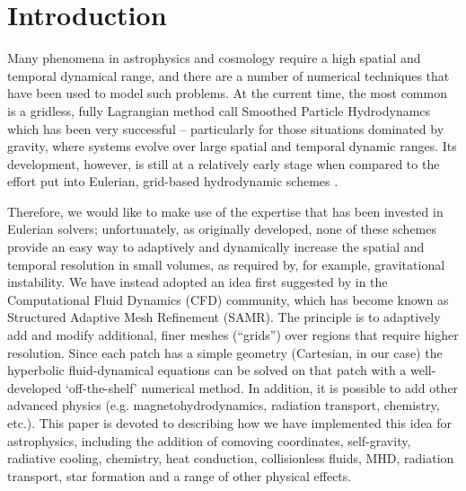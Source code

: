 
\section{Introduction}\label{sec.intro}


Many phenomena in astrophysics and cosmology require a high spatial and temporal dynamical range, and there are a number of numerical techniques that have been used to model such problems.  At the current time, the most common is a gridless, fully Lagrangian method call Smoothed Particle Hydrodynamcs \citep[SPH;][]{Lucy77, SPH} which has been very successful -- particularly for those situations dominated by gravity, where systems evolve over large spatial and temporal dynamic ranges.  Its development, however, is still at a relatively early stage when compared to the effort put into Eulerian, grid-based hydrodynamic schemes \citep[e.g.,][]{laney-1998, toro-1997, Woodward84}. 

Therefore, we would like to make use of the expertise that has been invested in Eulerian solvers; unfortunately, as originally developed, none of these schemes provide an easy way to adaptively and dynamically increase the spatial and temporal resolution in small volumes, as required by, for example, gravitational instability.  We have instead adopted an idea first suggested by \citet{Berger89} in the Computational Fluid Dynamics (CFD) community, which has become known as Structured Adaptive Mesh Refinement (SAMR).  The principle is to adaptively add and modify additional, finer meshes (``grids'') over regions that require higher resolution.  Since each patch has a simple geometry (Cartesian, in our case) the hyperbolic fluid-dynamical equations can be solved on that patch with a well-developed `off-the-shelf' numerical method.  In addition, it is possible to add other advanced physics (e.g. magnetohydrodynamics, radiation transport, chemistry, etc.). This paper is devoted to describing how we have implemented this idea for astrophysics, including the addition of comoving coordinates, self-gravity, radiative cooling, chemistry, heat conduction, collisionless fluids, MHD, radiation transport, star formation and a range of other physical effects.

